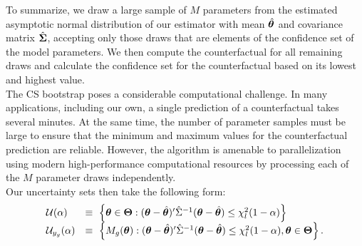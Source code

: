 \FloatBarrier

\noindent To summarize, we draw a large sample of $M$ parameters from the estimated asymptotic normal distribution of our estimator with mean $\hat{\bm{\theta}}$ and covariance matrix $\hat{\boldsymbol{\Sigma}}$, accepting only those draws that are elements of the confidence set of the model parameters. We then compute the counterfactual for all remaining draws and calculate the confidence set for the counterfactual based on its lowest and highest value.\\

\noindent The CS bootstrap poses a considerable computational challenge. In many applications, including our own, a single prediction of a counterfactual takes several minutes. At the same time, the number of parameter samples must be large to ensure that the minimum and maximum values for the counterfactual prediction are reliable. However, the algorithm is amenable to parallelization using modern high-performance computational resources by processing each of the $M$ parameter draws independently.\\

\noindent Our uncertainty sets then take the following form:
%
\begin{align*}\begin{array}{ll}
\mathcal{U}(\alpha) & \equiv\,\,  \left\{\bm{\theta} \in\bm{\Theta}: (\bm{\theta} - \hat{\bm{\theta}} )^\prime \hat{\Sigma}^{-1} (\bm{\theta} - \hat{\bm{\theta}}) \leq \chi_l^2(1 - \alpha)\right\}\\
\mathcal{U}_{y_g}(\alpha)     &\equiv\,\, \left\{M_g(\bm{\theta}): (\bm{\theta} - \hat{\bm{\theta}} )^\prime \hat{\Sigma}^{-1} (\bm{\theta} - \hat{\bm{\theta}}) \leq \chi_l^2(1 - \alpha), \bm{\theta}\in\bm{\Theta}\right\}.
\end{array}
\end{align*}
